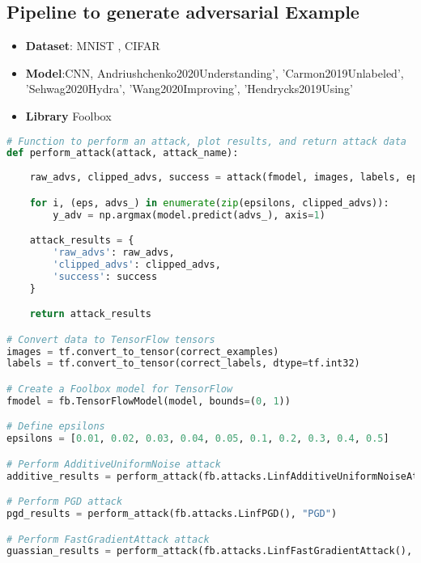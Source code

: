 \documentclass{article}
\begin{document}
\subsection{Pipeline to generate adversarial Example} 
\begin{itemize}
    \item \textbf{Dataset}: MNIST , CIFAR
    \item \textbf{Model}:CNN, Andriushchenko2020Understanding', 'Carmon2019Unlabeled', 'Sehwag2020Hydra', 'Wang2020Improving', 'Hendrycks2019Using'

    \item \textbf{Library} Foolbox
\end{itemize}
\begin{lstlisting}[language=Python, caption=Python code for generating attack examples]
# Function to perform an attack, plot results, and return attack data
def perform_attack(attack, attack_name):
    
    raw_advs, clipped_advs, success = attack(fmodel, images, labels, epsilons=epsilons)

    for i, (eps, advs_) in enumerate(zip(epsilons, clipped_advs)):
        y_adv = np.argmax(model.predict(advs_), axis=1)

    attack_results = {
        'raw_advs': raw_advs,
        'clipped_advs': clipped_advs,
        'success': success
    }

    return attack_results

# Convert data to TensorFlow tensors
images = tf.convert_to_tensor(correct_examples)
labels = tf.convert_to_tensor(correct_labels, dtype=tf.int32)

# Create a Foolbox model for TensorFlow
fmodel = fb.TensorFlowModel(model, bounds=(0, 1))

# Define epsilons
epsilons = [0.01, 0.02, 0.03, 0.04, 0.05, 0.1, 0.2, 0.3, 0.4, 0.5]

# Perform AdditiveUniformNoise attack
additive_results = perform_attack(fb.attacks.LinfAdditiveUniformNoiseAttack(), "AdditiveUniformNoise")

# Perform PGD attack
pgd_results = perform_attack(fb.attacks.LinfPGD(), "PGD")

# Perform FastGradientAttack attack
guassian_results = perform_attack(fb.attacks.LinfFastGradientAttack(), "FastGradientAttack")
\end{lstlisting}
\end{document}
